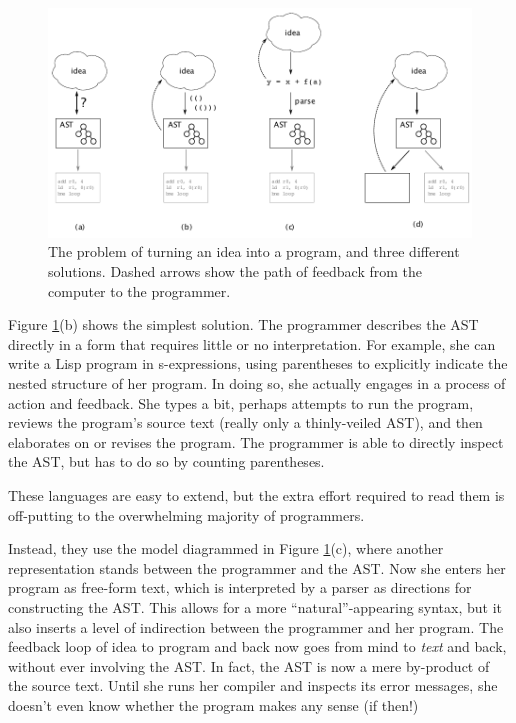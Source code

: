 \begin{figure}[h]
  \includegraphics{src/image/figure1.pdf}
  \caption{\label{fig-1}The problem of turning an idea into a program, and three different solutions. Dashed arrows show the path of feedback from the computer to the programmer.}
\end{figure}

Figure \ref{fig-1}(b) shows the simplest solution. The programmer describes the AST directly in a form that requires little or no interpretation. For example, she can write a Lisp program in s-expressions, using parentheses to explicitly indicate the nested structure of her program. In doing so, she actually engages in a process of action and feedback. She types a bit, perhaps attempts to run the program, reviews the program's source text (really only a thinly-veiled AST), and then elaborates on or revises the program. The programmer is able to directly inspect the AST, but has to do so by counting parentheses.

These languages are easy to extend, but the extra effort required to read them is off-putting to the overwhelming majority of programmers.

Instead, they use the model diagrammed in Figure \ref{fig-1}(c), where another representation stands between the programmer and the AST. Now she enters her program as free-form text, which is interpreted by a parser as directions for constructing the AST. This allows for a more ``natural''-appearing syntax, but it also inserts a level of indirection between the programmer and her program. The feedback loop of idea to program and back now goes from mind to \emph{text} and back, without ever involving the AST. In fact, the AST is now a mere by-product of the source text. Until she runs her compiler and inspects its error messages, she doesn't even know whether the program makes any sense (if then!)

